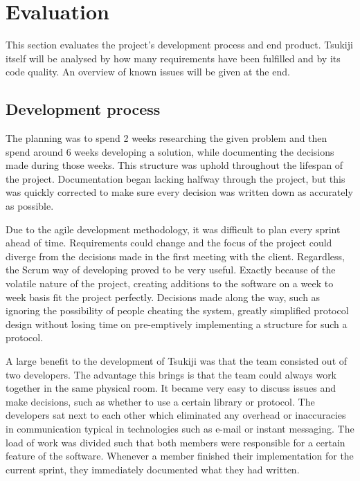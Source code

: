 \section{Evaluation}
\label{evaluation}
This section evaluates the project's development process and end product.
Tsukiji itself will be analysed by how many requirements have been fulfilled and by its code quality.
An overview of known issues will be given at the end.

\subsection{Development process}
The planning was to spend 2 weeks researching the given problem and then spend around 6 weeks developing a solution, while documenting the decisions made during those weeks.
This structure was uphold throughout the lifespan of the project.
Documentation began lacking halfway through the project, but this was quickly corrected to make sure every decision was written down as accurately as possible.

Due to the agile development methodology, it was difficult to plan every sprint ahead of time.
Requirements could change and the focus of the project could diverge from the decisions made in the first meeting with the client.
Regardless, the Scrum way of developing proved to be very useful.
Exactly because of the volatile nature of the project, creating additions to the software on a week to week basis fit the project perfectly. 
Decisions made along the way, such as ignoring the possibility of people cheating the system, greatly simplified protocol design without losing time on pre-emptively implementing a structure for such a protocol.

A large benefit to the development of Tsukiji was that the team consisted out of two developers.
The advantage this brings is that the team could always work together in the same physical room.
It became very easy to discuss issues and make decisions, such as whether to use a certain library or protocol.
The developers sat next to each other which eliminated any overhead or inaccuracies in communication typical in technologies such as e-mail or instant messaging.
The load of work was divided such that both members were responsible for a certain feature of the software.
Whenever a member finished their implementation for the current sprint, they immediately documented what they had written.

